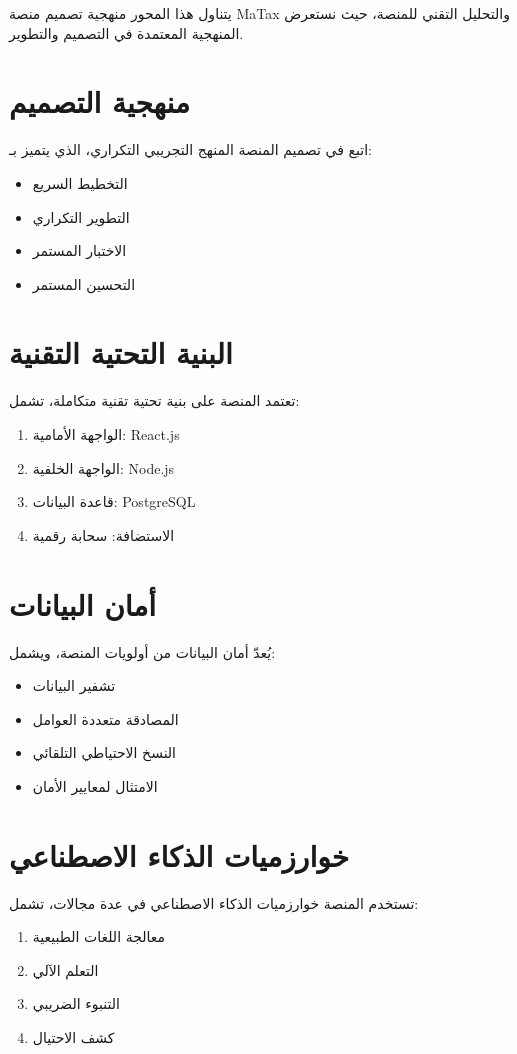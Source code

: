 \documentclass[12pt, a4paper, twoside]{report}
\begin{document}
يتناول هذا المحور منهجية تصميم منصة MaTax والتحليل التقني للمنصة، حيث نستعرض المنهجية المعتمدة في التصميم والتطوير.

\section{منهجية التصميم}

اتبع في تصميم المنصة المنهج التجريبي التكراري، الذي يتميز بـ:
\begin{itemize}
    \item التخطيط السريع
    \item التطوير التكراري
    \item الاختبار المستمر
    \item التحسين المستمر
\end{itemize}

\section{البنية التحتية التقنية}

تعتمد المنصة على بنية تحتية تقنية متكاملة، تشمل:
\begin{enumerate}
    \item الواجهة الأمامية: React.js
    \item الواجهة الخلفية: Node.js
    \item قاعدة البيانات: PostgreSQL
    \item الاستضافة: سحابة رقمية
\end{enumerate}

\section{أمان البيانات}

يُعدّ أمان البيانات من أولويات المنصة، ويشمل:
\begin{itemize}
    \item تشفير البيانات
    \item المصادقة متعددة العوامل
    \item النسخ الاحتياطي التلقائي
    \item الامتثال لمعايير الأمان
\end{itemize}

\section{خوارزميات الذكاء الاصطناعي}

تستخدم المنصة خوارزميات الذكاء الاصطناعي في عدة مجالات، تشمل:
\begin{enumerate}
    \item معالجة اللغات الطبيعية
    \item التعلم الآلي
    \item التنبوء الضريبي
    \item كشف الاحتيال
\end{enumerate}
\end{document}
